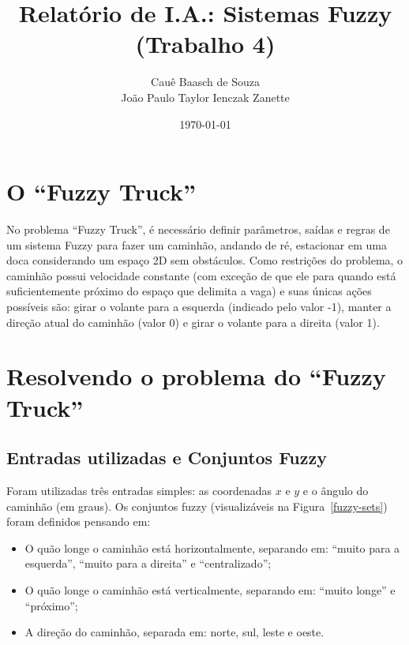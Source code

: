\documentclass[twocolumn]{article}
\title{Relatório de I.A.: Sistemas Fuzzy (Trabalho 4)}
\author{Cauê Baasch de Souza \\
        João Paulo Taylor Ienczak Zanette}
\date{\today}
\newcommand{\todo}[1]{{\color{red}{#1}}}
\begin{document}
    \maketitle{}

    \todo{%
        TO-DO\@:
        \begin{itemize}
            \item Conjuntos Fuzzy;
            \item Regras;
            \item Método de defuzzificação;
            \item Dificuldades encontradas e como foram superadas.
        \end{itemize}
    }

    \section{O ``Fuzzy Truck''}

    No problema ``Fuzzy Truck'', é necessário definir parâmetros, saídas e
    regras de um sistema Fuzzy para fazer um caminhão, andando de ré,
    estacionar em uma doca considerando um espaço 2D sem obstáculos. Como
    restrições do problema, o caminhão possui velocidade constante (com exceção
    de que ele para quando está suficientemente próximo do espaço que delimita
    a vaga) e suas únicas ações possíveis são: girar o volante para a esquerda
    (indicado pelo valor -1), manter a direção atual do caminhão (valor 0) e
    girar o volante para a direita (valor 1).

    \section{Resolvendo o problema do ``Fuzzy Truck''}

    \subsection{Entradas utilizadas e Conjuntos Fuzzy}

    Foram utilizadas três entradas simples: as coordenadas $x$ e $y$ e o ângulo
    do caminhão (em graus). Os conjuntos fuzzy (visualizáveis na
    Figura~\ref{fuzzy-sets}) foram definidos pensando em:

    \begin{itemize}
        \item O quão longe o caminhão está horizontalmente, separando em:
            ``muito para a esquerda'', ``muito para a direita'' e
            ``centralizado'';
        \item O quão longe o caminhão está verticalmente, separando em: ``muito
            longe'' e ``próximo'';
        \item A direção do caminhão, separada em: norte, sul, leste e oeste.
    \end{itemize}
\end{document}
